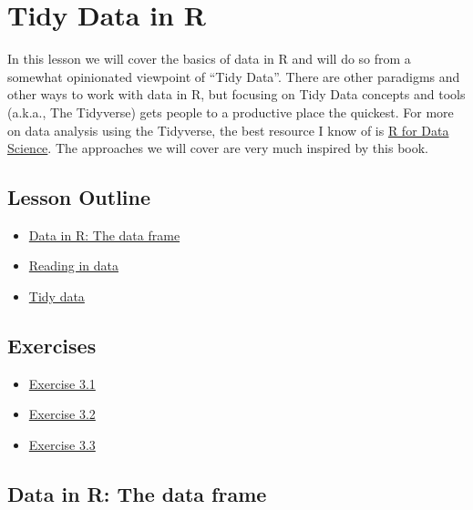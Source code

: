 \documentclass[]{article}
\title{}
\author{}
\date{}
\providecommand{\tightlist}{%
  \setlength{\itemsep}{0pt}\setlength{\parskip}{0pt}}
\begin{document}
\hypertarget{tidy-data-in-r}{%
\section{Tidy Data in R}\label{tidy-data-in-r}}

In this lesson we will cover the basics of data in R and will do so from
a somewhat opinionated viewpoint of ``Tidy Data''. There are other
paradigms and other ways to work with data in R, but focusing on Tidy
Data concepts and tools (a.k.a., The Tidyverse) gets people to a
productive place the quickest. For more on data analysis using the
Tidyverse, the best resource I know of is \href{http://r4ds.had.co.nz}{R
for Data Science}. The approaches we will cover are very much inspired
by this book.

\hypertarget{lesson-outline}{%
\subsection{Lesson Outline}\label{lesson-outline}}

\begin{itemize}
\tightlist
\item
  \protect\hyperlink{data-in-r-the-data-frame}{Data in R: The data
  frame}
\item
  \protect\hyperlink{reading-in-data}{Reading in data}
\item
  \protect\hyperlink{tidy-data}{Tidy data}
\end{itemize}

\hypertarget{exercises}{%
\subsection{Exercises}\label{exercises}}

\begin{itemize}
\tightlist
\item
  \protect\hyperlink{exercise-31}{Exercise 3.1}
\item
  \protect\hyperlink{exercise-32}{Exercise 3.2}
\item
  \protect\hyperlink{exercise-33}{Exercise 3.3}
\end{itemize}

\hypertarget{data-in-r-the-data-frame}{%
\subsection{Data in R: The data frame}\label{data-in-r-the-data-frame}}
\end{document}
